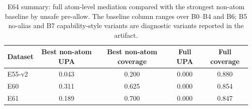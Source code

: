 \begin{table}[t]
\centering
\small
\caption{E64 summary: full atom-level mediation compared with the strongest non-atom baseline by unsafe pre-allow. The baseline column ranges over B0--B4 and B6; B5 no-alias and B7 capability-style variants are diagnostic variants reported in the artifact.}
\label{tab:baselines-summary}
\begin{tabular}{lcccc}
\toprule
Dataset & Best non-atom UPA & Best non-atom coverage & Full UPA & Full coverage \\
\midrule
E55-v2 & 0.043 & 0.200 & 0.000 & 0.880 \\
E60 & 0.311 & 0.625 & 0.000 & 0.854 \\
E61 & 0.189 & 0.700 & 0.000 & 0.847 \\
\bottomrule
\end{tabular}
\end{table}
